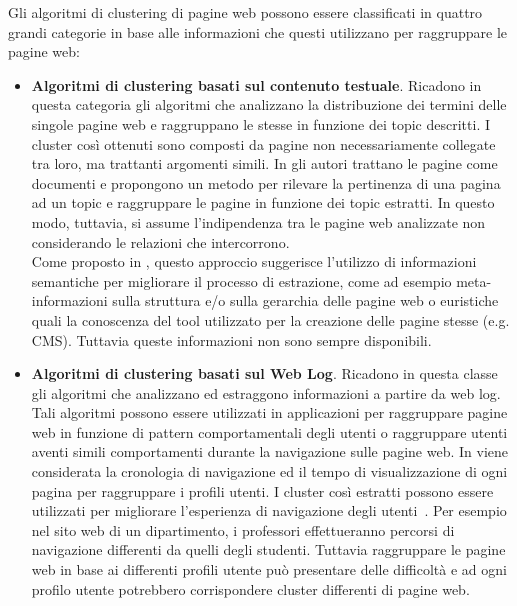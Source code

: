 Gli algoritmi di clustering di pagine web possono essere classificati in quattro grandi categorie in base alle informazioni che questi utilizzano per raggruppare le pagine web:

\begin{itemize}

\item \textbf{Algoritmi di clustering basati sul contenuto testuale}. Ricadono in questa categoria gli algoritmi che analizzano la distribuzione dei termini delle singole pagine web e raggruppano le stesse in funzione dei topic descritti. I cluster così ottenuti sono composti da pagine non necessariamente collegate tra loro, ma trattanti  argomenti simili. 
In \cite{chiang15} gli autori trattano le pagine come documenti e propongono un metodo per rilevare la pertinenza di una pagina ad un topic e raggruppare le pagine in funzione dei topic estratti. In questo modo, tuttavia, si assume l'indipendenza tra le pagine web analizzate non considerando le relazioni che intercorrono.\\
Come proposto in \cite{Cooley03}, questo approccio suggerisce l'utilizzo di informazioni semantiche per migliorare il processo di estrazione, come ad esempio meta-informazioni sulla struttura e/o sulla gerarchia delle pagine web o euristiche quali la conoscenza del tool utilizzato per la creazione delle pagine stesse (e.g. CMS). Tuttavia queste informazioni non sono sempre disponibili.%

\item \textbf{Algoritmi di clustering basati sul Web Log}. 
Ricadono in questa classe gli algoritmi che analizzano ed estraggono informazioni a partire da web log. Tali algoritmi possono essere utilizzati in applicazioni per raggruppare pagine web in funzione di pattern comportamentali degli utenti o raggruppare utenti aventi simili comportamenti durante la navigazione sulle pagine web.
In \cite{Shahabi97} viene considerata la cronologia di navigazione ed il tempo di visualizzazione di ogni pagina per raggruppare i profili utenti. I cluster così estratti possono essere utilizzati per migliorare l'esperienza di navigazione degli utenti~\cite{Crabtree06}. Per esempio nel sito web di un dipartimento, i professori effettueranno percorsi di navigazione differenti da quelli degli studenti. Tuttavia raggruppare le pagine web in base ai differenti profili utente può presentare delle difficoltà e ad ogni profilo utente potrebbero corrispondere cluster differenti di pagine web.


\end{itemize}
